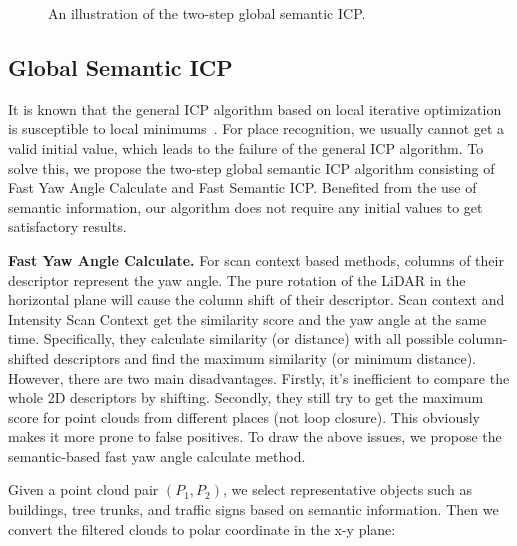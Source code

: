 \documentclass[letterpaper, 10 pt, conference]{ieeeconf}
\begin{document}
\begin{figure}[t]
    \centering
{}
    \caption{An illustration of the two-step global semantic ICP.}
    \label{pic:yaw_icp}
 \end{figure}

\subsection{Global Semantic ICP}
It is known that the general ICP algorithm based on local iterative optimization is susceptible to local minimums~\cite{goicp}. For place recognition, we usually cannot get a valid initial value, which leads to the failure of the general ICP algorithm. To solve this, we propose the two-step global semantic ICP algorithm consisting of Fast Yaw Angle Calculate and Fast Semantic ICP. Benefited from the use of semantic information, our algorithm does not require any initial values to get satisfactory results.

\textbf{Fast Yaw Angle Calculate.}\label{ssc:yaw}
For scan context based methods, columns of their descriptor represent the yaw angle. The pure rotation of the LiDAR in the horizontal plane will cause the column shift of their descriptor. Scan context and Intensity Scan Context get the similarity score and the yaw angle at the same time. Specifically, they calculate similarity (or distance) with all possible column-shifted descriptors and find the maximum similarity (or minimum distance). However, there are two main disadvantages. Firstly, it's inefficient to compare the whole 2D descriptors by shifting. Secondly, they still try to get the maximum score for point clouds from different places (not loop closure). This obviously makes it more prone to false positives. To draw the above issues, we propose the semantic-based fast yaw angle calculate method.

Given a point cloud pair \( (P_1,P_2)\), we select representative objects such as buildings, tree trunks, and traffic signs based on semantic information. Then we convert the filtered clouds to polar coordinate in  the x-y plane:
\end{document}
